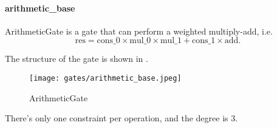 \paragraph{arithmetic\_base}

ArithmeticGate is a gate that can perform a weighted multiply-add, i.e.
\[ \text{res} = \text{cons\_0} \times \text{mul\_0} \times \text{mul\_1} + \text{cons\_1} \times \text{add}. \]

The structure of the gate is shown in .

\begin{figure}[!ht]
    \centering
    \texttt{[image: gates/arithmetic\_base.jpeg]}
    \caption{ArithmeticGate}
    \label{fig:arithmetic-gate}
\end{figure}

There's only one constraint per operation, and the degree is 3.
